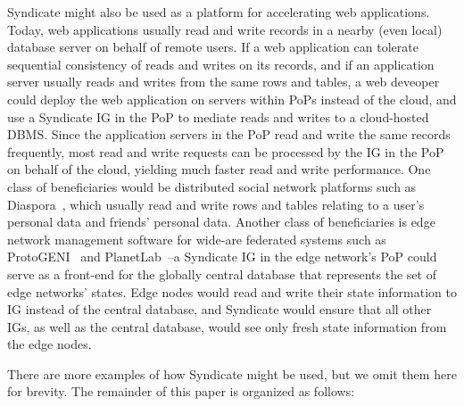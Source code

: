 Syndicate might also be used as a platform for accelerating web applications.  Today, web applications usually read and write records in a nearby (even local) database server on behalf of remote users.  If a web application can tolerate sequential consistency of reads and writes on its records, and if an application server usually reads and writes from the same rows and tables, a web deveoper could deploy the web application on servers within PoPs instead of the cloud, and use a Syndicate IG in the PoP to mediate reads and writes to a cloud-hosted DBMS.  Since the application servers in the PoP read and write the same records frequently, most read and write requests can be processed by the IG in the PoP on behalf of the cloud, yielding much faster read and write performance.  One class of beneficiaries would be distributed social network platforms such as Diaspora~\cite{Diaspora}, which usually read and write rows and tables relating to a user's personal data and friends' personal data.  Another class of beneficiaries is edge network management software for wide-are federated systems such as ProtoGENI~\cite{ProtoGENI} and PlanetLab~\cite{PlanetLab}--a Syndicate IG in the edge network's PoP could serve as a front-end for the globally central database that represents the set of edge networks' states.  Edge nodes would read and write their state information to IG instead of the central database, and Syndicate would ensure that all other IGs, as well as the central database, would see only fresh state information from the edge nodes.

There are more examples of how Syndicate might be used, but we omit them here for brevity.  The remainder of this paper is organized as follows:



